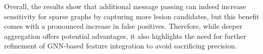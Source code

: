 \documentclass[FCD_GNN.tex]{subfiles}
\begin{document}
Overall, the results show that additional message passing can indeed increase sensitivity for sparse graphs by 
capturing more lesion candidates, but this benefit comes with a pronounced increase in false positives. 
Therefore, while deeper aggregation offers potential advantages, it also highlights the need for further refinement 
of GNN-based feature integration to avoid sacrificing precision.
\end{document}

